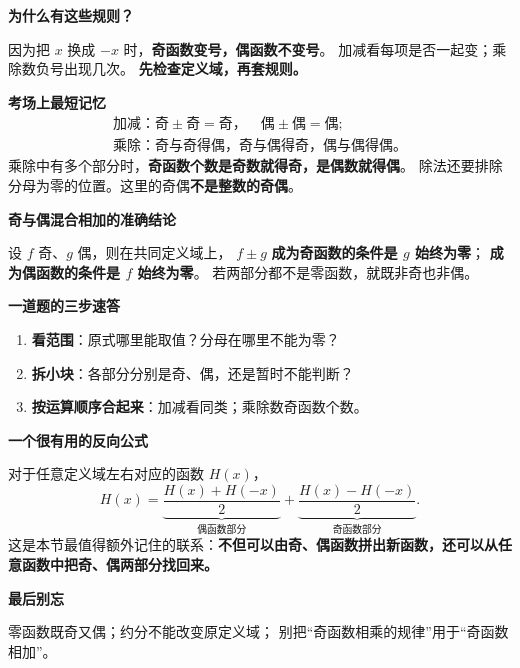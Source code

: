 \clearpage
\begin{summarybox}
\textbf{\textcolor{CSummary}{为什么有这些规则？}}

因为把 $x$ 换成 $-x$ 时，\textbf{奇函数变号，偶函数不变号}。
加减看每项是否一起变；乘除数负号出现几次。
\textbf{先检查定义域，再套规则。}

\medskip
\textbf{\textcolor{CSummary}{考场上最短记忆}}
\[
\boxed{\begin{gathered}
\text{加减：奇}\pm\text{奇}=\text{奇}，\quad
\text{偶}\pm\text{偶}=\text{偶};\\
\text{乘除：奇与奇得偶，奇与偶得奇，偶与偶得偶。}
\end{gathered}}
\]
乘除中有多个部分时，\textbf{奇函数个数是奇数就得奇，是偶数就得偶}。
除法还要排除分母为零的位置。这里的奇偶\textbf{不是整数的奇偶}。

\medskip
\textbf{\textcolor{CSummary}{奇与偶混合相加的准确结论}}

设 $f$ 奇、$g$ 偶，则在共同定义域上，
$f\pm g$ \textbf{成为奇函数的条件是 $g$ 始终为零}；
\textbf{成为偶函数的条件是 $f$ 始终为零}。
若两部分都不是零函数，就既非奇也非偶。

\medskip
\textbf{\textcolor{CSummary}{一道题的三步速答}}
\begin{enumerate}[leftmargin=*,itemsep=0.25em,topsep=0.3em]
\item \textbf{看范围}：原式哪里能取值？分母在哪里不能为零？
\item \textbf{拆小块}：各部分分别是奇、偶，还是暂时不能判断？
\item \textbf{按运算顺序合起来}：加减看同类；乘除数奇函数个数。
\end{enumerate}

\medskip
\textbf{\textcolor{CSummary}{一个很有用的反向公式}}

对于任意定义域左右对应的函数 $H(x)$，
\[
\boxed{H(x)=
\underbrace{\frac{H(x)+H(-x)}2}_{\text{偶函数部分}}+
\underbrace{\frac{H(x)-H(-x)}2}_{\text{奇函数部分}}.}
\]
这是本节最值得额外记住的联系：\textbf{不但可以由奇、偶函数拼出新函数，还可以从任意函数中把奇、偶两部分找回来。}

\medskip
\textbf{\textcolor{CSummary}{最后别忘}}

零函数既奇又偶；约分不能改变原定义域；
别把“奇函数相乘的规律”用于“奇函数相加”。
\end{summarybox}
